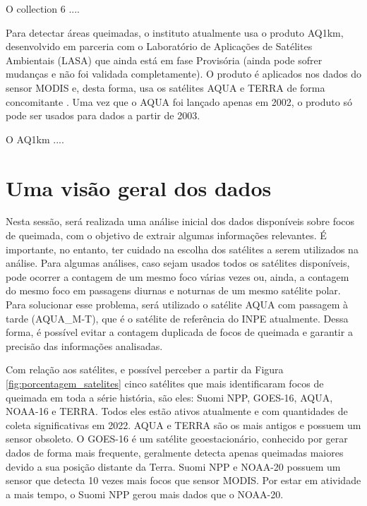 \documentclass[cic,tc]{iiufrgs}
\begin{document}
O collection 6 .... \citep{GIGLIO2016} \par

Para detectar áreas queimadas, o instituto atualmente usa o produto AQ1km, desenvolvido em parceria com o Laboratório de Aplicações de Satélites Ambientais (LASA) \citep{SiteAQ1km} que ainda está em fase Provisória (ainda pode sofrer mudanças e não foi validada completamente). O produto é aplicados nos dados do sensor MODIS e, desta forma, usa os satélites AQUA e TERRA de forma concomitante \citep{libonati2015algorithm}. Uma vez que o AQUA foi lançado apenas em 2002, o produto só pode ser usados para dados a partir de 2003. \par

O AQ1km .... \citep{libonati2015algorithm} \par

\section{Uma visão geral dos dados}

Nesta sessão, será realizada uma análise inicial dos dados disponíveis sobre focos de queimada, com o objetivo de extrair algumas informações relevantes. É importante, no entanto, ter cuidado na escolha dos satélites a serem utilizados na análise. Para algumas análises, caso sejam usados todos os satélites disponíveis, pode ocorrer a contagem de um mesmo foco várias vezes ou, ainda, a contagem do mesmo foco em passagens diurnas e noturnas de um mesmo satélite polar. Para solucionar esse problema, será utilizado o satélite AQUA com passagem à tarde (AQUA\_M-T), que é  o satélite de referência do INPE atualmente. Dessa forma, é possível evitar a contagem duplicada de focos de queimada e garantir a precisão das informações analisadas. \par

Com relação aos satélites, e possível perceber a partir da Figura \ref{fig:porcentagem_satelites} cinco satélites que mais identificaram focos de queimada em toda a série história, são eles: Suomi NPP, GOES-16, AQUA, NOAA-16 e TERRA. Todos eles estão ativos atualmente e com quantidades de coleta significativas em 2022. AQUA e TERRA são os mais antigos e possuem um sensor obsoleto. O GOES-16 é um satélite geoestacionário, conhecido por gerar dados de forma mais frequente, geralmente detecta apenas queimadas maiores devido a sua posição distante da Terra. Suomi NPP e NOAA-20 possuem um sensor que detecta 10 vezes mais focos que sensor MODIS. Por estar em atividade a mais tempo, o Suomi NPP gerou mais dados que o NOAA-20. \par
\end{document}
